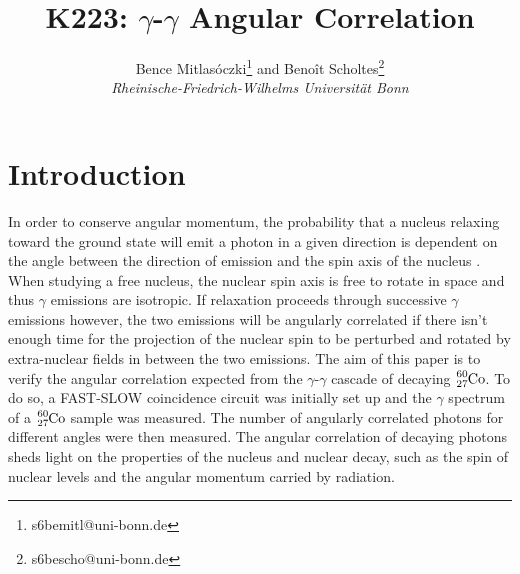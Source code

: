 \documentclass[twocolumn]{article}
\title{\textbf{K223: $\gamma$-$\gamma$ Angular Correlation}}
\author{Bence Mitlasóczki\thanks{s6bemitl@uni-bonn.de} and Beno\^it Scholtes\thanks{s6bescho@uni-bonn.de} \\ \textit{Rheinische-Friedrich-Wilhelms Universit\"at Bonn}}
\begin{document}
\renewcommand{\abstractname}{\vspace{-\baselineskip}} %
\twocolumn[ %
\begin{@twocolumnfalse}
\maketitle
\begin{abstract} \vspace{-10mm}
This paper analyses the angular correlation between subsequent photon emissions in the $\gamma$-$\gamma$ cascade of decaying $\ce{_27^{60}Co}$. A fast-slow coincidence circuit with scintillation detectors, single channel analysers, and constant fraction discriminators were used measure the number of $\gamma$-$\gamma$ cascade decays for angular separations from 90$^\circ$ to 270$^\circ$. The data was corrected for the measured accidental coincidences. The data was in agreement with the theoretical angular correlation function and its coefficients. The fit coefficient values calculated are $B = 0.116  \pm 0.066 $ and $C = 0.040 \pm 0.075$. The large uncertainty is to be expected from previous experiments.
\end{abstract}
\end{@twocolumnfalse}
\hspace{5mm} ]
\maketitle
\saythanks %
\section{Introduction}
In order to conserve angular momentum, the probability that a nucleus relaxing toward the ground state will emit a photon in a given direction is dependent on the angle between the direction of emission and the spin axis of the nucleus \cite{sieg}. When studying a free nucleus, the nuclear spin axis is free to rotate in space and thus $\gamma$ emissions are isotropic. If relaxation proceeds through successive $\gamma$ emissions however, the two emissions will be angularly correlated if there isn't enough time for the projection of the nuclear spin to be perturbed and rotated by extra-nuclear fields in between the two emissions. The aim of this paper is to verify the angular correlation expected from the $\gamma$-$\gamma$ cascade of decaying $\ce{_27^{60}Co}$. To do so, a FAST-SLOW coincidence circuit was initially set up and the $\gamma$ spectrum of a $\ce{_27^{60}Co}$ sample was measured. The number of angularly correlated photons for different angles were then measured. The angular correlation of decaying photons sheds light on the properties of the nucleus and nuclear decay, such as the spin of nuclear levels and the angular momentum carried by radiation. 
\end{document}
